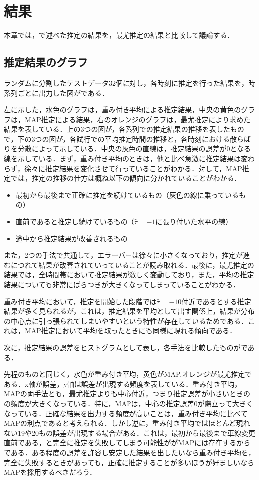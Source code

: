 \chapter{結果}
本章では，で述べた推定の結果を，最尤推定の結果と比較して議論する．
\section{推定結果のグラフ}
ランダムに分割したテストデータ32個に対し，各時刻に推定を行った結果を，時系列ごとに出力した図がである．

左に示した，水色のグラフは，重み付き平均による推定結果，中央の黄色のグラフは，MAP推定による結果，右のオレンジのグラフは，最尤推定により求めた結果を表している．上の3つの図が，各系列での推定結果の推移を表したもので，下の3つの図が，各試行での平均推定時間の推移と，各時刻における散らばりを分散によって示している．中央の灰色の直線は，推定結果の誤差が0となる線を示している．まず，重み付き平均のときは，他と比べ急激に推定結果は変わらず，徐々に推定結果を変化させて行っていることがわかる．対して，MAP推定では，推定の推移の仕方は概ね以下の傾向に分かれていることがわかる．
\begin{itemize}
	\item 最初から最後まで正確に推定を続けているもの（灰色の線に乗っているもの）
	\item 直前であると推定し続けているもの（$\hat{\tau}=-1$に張り付いた水平の線）
	\item 途中から推定結果が改善されるもの
\end{itemize}
また，2つの手法で共通して，エラーバーは徐々に小さくなっており，推定が進むにつれて結果が改善されていっていることが読み取れる．最後に，最尤推定の結果では，全時間帯において推定結果が激しく変動しており，また，平均の推定結果についても非常にばらつきが大きくなってしまっていることがわかる．
\par
重み付き平均において，推定を開始した段階では$\hat{\tau}=-10$付近であるとする推定結果が多く見られるが，これは，推定結果を平均として出す関係上，結果が分布の中心点に引っ張られてしまいやすいという特性が存在しているためである．これは，MAP推定において平均を取ったときにも同様に現れる傾向である．
\par
次に，推定結果の誤差をヒストグラムとして表し，各手法を比較したものがである．

先程のものと同じく，水色が重み付き平均，黄色がMAP,オレンジが最尤推定である．x軸が誤差，y軸は誤差が出現する頻度を表している．重み付き平均，MAPの両手法とも，最尤推定よりも中心付近，つまり推定誤差が小さいときのの頻度が大きくなっている．特に，MAPは，中心の推定誤差0が際立って大きくなっている．正確な結果を出力する頻度が高いことは，重み付き平均に比べてMAPの利点であると考えられる．しかし逆に，重み付き平均ではほとんど現れない19や20もの誤差が出現する場合がある．これは，最初から最後まで車線変更直前である，と完全に推定を失敗してしまう可能性ががMAPには存在するからである．ある程度の誤差を許容し安定した結果を出したいなら重み付き平均を，完全に失敗するときがあっても，正確に推定することが多いほうが好ましいならMAPを採用するべきだろう．
